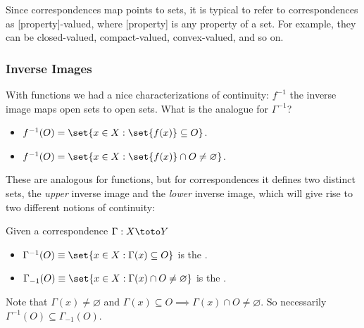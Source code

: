 \documentclass{article}
\begin{document}
\begin{remark}
  Since correspondences map points to sets, it is typical to refer to correspondences as [property]-valued, where [property] is any property of a set. For example, they can be closed-valued, compact-valued, convex-valued, and so on.
\end{remark}

\subsubsection{Inverse Images}
\label{ssub:inverse_images}

With functions we had a nice characterizations of continuity: $f^{-1}$ the inverse image maps open sets to open sets. What is the analogue for $\Gamma^{-1}$?
\begin{itemize}[label=$\bullet$]
  \item $f^{-1}(O) = \set{x \in X: \set{f(x)} \subseteq O}$.

  \item $f^{-1}(O) = \set{x \in X: \set{f(x)} \cap O \ne \varnothing}$.
\end{itemize}

These are analogous for functions, but for correspondences it defines two distinct sets, the \textit{upper} inverse image and the \textit{lower} inverse image, which will give rise to two different notions of continuity:
\begin{definition}
  Given a correspondence $\Gamma: X \toto Y$
  \begin{itemize}[label=$\bullet$]
    \item $\Gamma^{-1}(O) \equiv \set{x \in X: \Gamma(x) \subseteq O}$ is the .

    \item $\Gamma_{-1}(O) \equiv \set{x \in X: \Gamma(x) \cap O \ne \varnothing}$ is the .
  \end{itemize}
\end{definition}

Note that $\Gamma(x) \ne \varnothing$ and $\Gamma(x) \subseteq O \implies \Gamma(x) \cap O \ne \varnothing$. So necessarily $\Gamma^{-1}(O) \subseteq \Gamma_{-1}(O)$.
\end{document}
